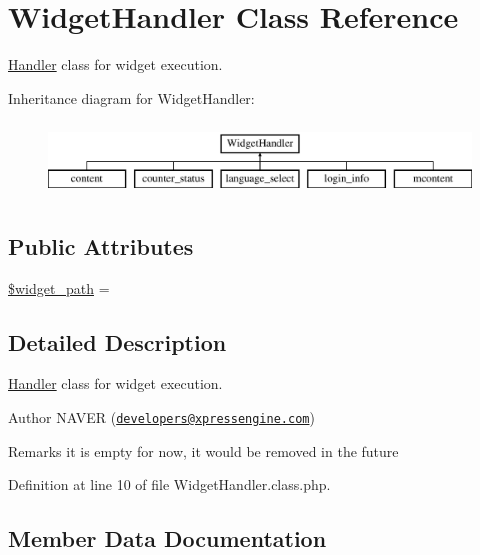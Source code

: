 \hypertarget{classWidgetHandler}{}\section{Widget\+Handler Class Reference}
\label{classWidgetHandler}


\hyperlink{classHandler}{Handler} class for widget execution.  


Inheritance diagram for Widget\+Handler\+:\begin{figure}[H]
\begin{center}
\leavevmode
\includegraphics[height=2.000000cm]{classWidgetHandler}
\end{center}
\end{figure}
\subsection*{Public Attributes}
\begin{DoxyCompactItemize}
\item 
\hyperlink{classWidgetHandler_a153b7e8baf0e97c152eb6d4dfae17e9d}{\$widget\+\_\+path} = \textquotesingle{}\textquotesingle{}
\end{DoxyCompactItemize}


\subsection{Detailed Description}
\hyperlink{classHandler}{Handler} class for widget execution. 

\begin{DoxyAuthor}{Author}
N\+A\+V\+ER (\href{mailto:developers@xpressengine.com}{\tt developers@xpressengine.\+com}) 
\end{DoxyAuthor}
\begin{DoxyRemark}{Remarks}
it is empty for now, it would be removed in the future 
\end{DoxyRemark}


Definition at line 10 of file Widget\+Handler.\+class.\+php.



\subsection{Member Data Documentation}
